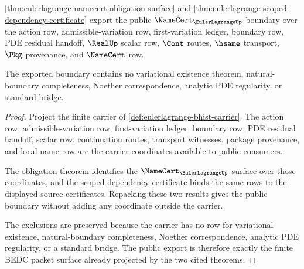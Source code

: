 \begin{theorem}
\label{thm:eulerlagrange-public-export}
\autoref{thm:eulerlagrange-namecert-obligation-surface} and
\autoref{thm:eulerlagrange-scoped-dependency-certificate} export the public
$\NameCert_{\EulerLagrangeUp}$ boundary over the action row,
admissible-variation row, first-variation ledger, boundary row, PDE residual
handoff, $\RealUp$ scalar row, $\Cont$ routes, $\hsame$ transport, $\Pkg$
provenance, and $\NameCert$ row.

The exported boundary contains no variational existence theorem,
natural-boundary completeness, Noether correspondence, analytic PDE
regularity, or standard bridge.
\end{theorem}
\begin{proof}
Project the finite carrier of \autoref{def:eulerlagrange-bhist-carrier}. The
action row, admissible-variation row, first-variation ledger, boundary row, PDE
residual handoff, scalar row, continuation routes, transport witnesses, package
provenance, and local name row are the carrier coordinates available to public
consumers.

The obligation theorem identifies the $\NameCert_{\EulerLagrangeUp}$ surface
over those coordinates, and the scoped dependency certificate binds the same
rows to the displayed source certificates. Repacking these two results gives
the public boundary without adding any coordinate outside the carrier.

The exclusions are preserved because the carrier has no row for variational
existence, natural-boundary completeness, Noether correspondence, analytic PDE
regularity, or a standard bridge. The public export is therefore exactly the
finite BEDC packet surface already projected by the two cited theorems.
\end{proof}

